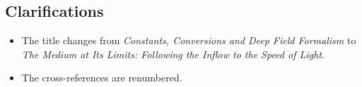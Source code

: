 \documentclass[11pt,a4paper]{article}
\begin{document}
\subsection*{Clarifications}
\begin{itemize}
\item The title changes from \textit{Constants, Conversions and Deep Field Formalism} to \textit{The Medium at Its Limits: Following the Inflow to the Speed of Light}.
\item The cross-references are renumbered.
\end{itemize}


\end{document}
